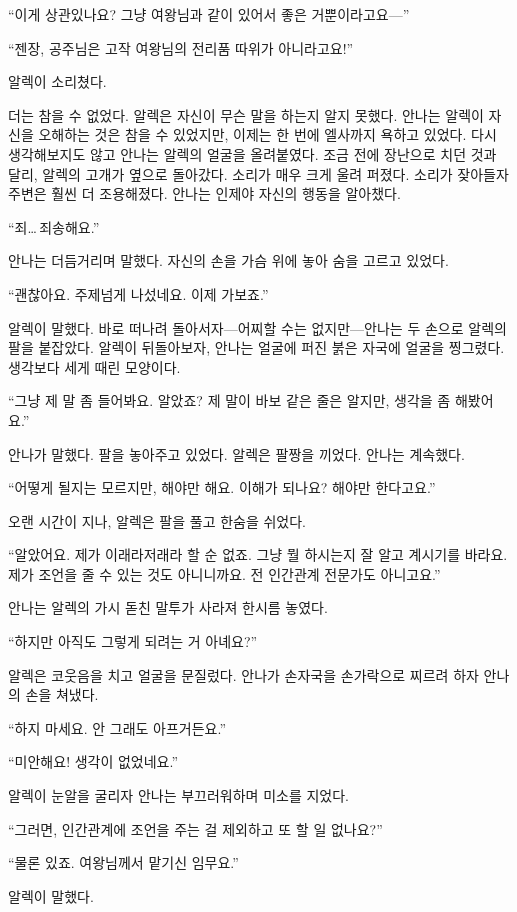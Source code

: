 ``이게 상관있나요? 그냥 여왕님과 같이 있어서 좋은 거뿐이라고요—''

``젠장, 공주님은 고작 여왕님의 전리품 따위가 아니라고요!''

알렉이 소리쳤다.

더는 참을 수 없었다. 알렉은 자신이 무슨 말을 하는지 알지 못했다. 안나는 알렉이 자신을 오해하는 것은 참을 수 있었지만, 이제는 한 번에 엘사까지 욕하고 있었다. 다시 생각해보지도 않고 안나는 알렉의 얼굴을 올려붙였다. 조금 전에 장난으로 치던 것과 달리, 알렉의 고개가 옆으로 돌아갔다. 소리가 매우 크게 울려 퍼졌다. 소리가 잦아들자 주변은 훨씬 더 조용해졌다. 안나는 인제야 자신의 행동을 알아챘다.

``죄\ldots\,죄송해요.''

안나는 더듬거리며 말했다. 자신의 손을 가슴 위에 놓아 숨을 고르고 있었다.

``괜찮아요. 주제넘게 나섰네요. 이제 가보죠.''

알렉이 말했다. 바로 떠나려 돌아서자—어찌할 수는 없지만—안나는 두 손으로 알렉의 팔을 붙잡았다. 알렉이 뒤돌아보자, 안나는 얼굴에 퍼진 붉은 자국에 얼굴을 찡그렸다. 생각보다 세게 때린 모양이다.

``그냥 제 말 좀 들어봐요. 알았죠? 제 말이 바보 같은 줄은 알지만, 생각을 좀 해봤어요.''

안나가 말했다. 팔을 놓아주고 있었다. 알렉은 팔짱을 끼었다. 안나는 계속했다.

``어떻게 될지는 모르지만, 해야만 해요. 이해가 되나요? 해야만 한다고요.''

오랜 시간이 지나, 알렉은 팔을 풀고 한숨을 쉬었다.

``알았어요. 제가 이래라저래라 할 순 없죠. 그냥 뭘 하시는지 잘 알고 계시기를 바라요. 제가 조언을 줄 수 있는 것도 아니니까요. 전 인간관계 전문가도 아니고요.''

안나는 알렉의 가시 돋친 말투가 사라져 한시름 놓였다.

``하지만 아직도 그렇게 되려는 거 아녜요?''

알렉은 코웃음을 치고 얼굴을 문질렀다. 안나가 손자국을 손가락으로 찌르려 하자 안나의 손을 쳐냈다.

``하지 마세요. 안 그래도 아프거든요.''

``미안해요! 생각이 없었네요.''

알렉이 눈알을 굴리자 안나는 부끄러워하며 미소를 지었다.

``그러면, 인간관계에 조언을 주는 걸 제외하고 또 할 일 없나요?''

``물론 있죠. 여왕님께서 맡기신 임무요.''

알렉이 말했다.

